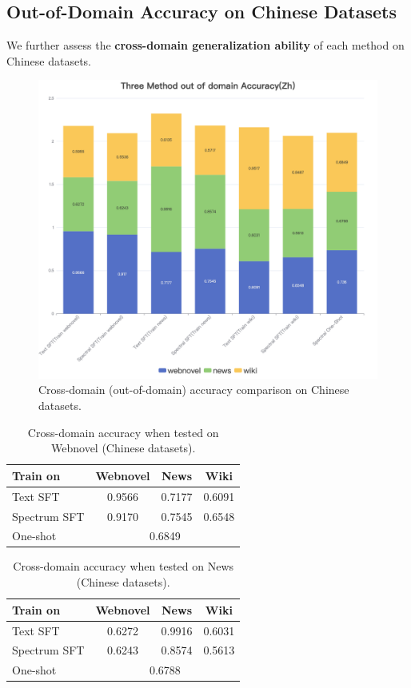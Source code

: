 \documentclass[lettersize,journal]{IEEEtran}
\begin{document}
\subsection{Out-of-Domain Accuracy on Chinese Datasets}

We further assess the \textbf{cross-domain generalization ability }of each method on Chinese datasets.

\begin{figure}[H]
    \centering
    \includegraphics[width=0.65\linewidth]{images/Three Method out of domain Accuracy(Zh).png}
    \caption{Cross-domain (out-of-domain) accuracy comparison on Chinese datasets.}
\end{figure}
\begin{table}[H]
\centering
\begin{tabular}{|l|c|c|c|}
\hline
Train on & Webnovel & News & Wiki \\
\hline
Text SFT     & 0.9566 & 0.7177 & 0.6091 \\
\hline
Spectrum SFT & 0.9170 & 0.7545 & 0.6548 \\
\hline
One-shot     & \multicolumn{3}{c|}{0.6849} \\
\hline
\end{tabular}
\caption{Cross-domain accuracy when tested on Webnovel (Chinese datasets).}
\end{table}

\begin{table}[H]
\centering
\begin{tabular}{|l|c|c|c|}
\hline
Train on & Webnovel & News & Wiki \\
\hline
Text SFT     & 0.6272 & 0.9916 & 0.6031 \\
\hline
Spectrum SFT & 0.6243 & 0.8574 & 0.5613 \\
\hline
One-shot     & \multicolumn{3}{c|}{0.6788} \\
\hline
\end{tabular}
\caption{Cross-domain accuracy when tested on News (Chinese datasets).}
\end{table}
\end{document}

